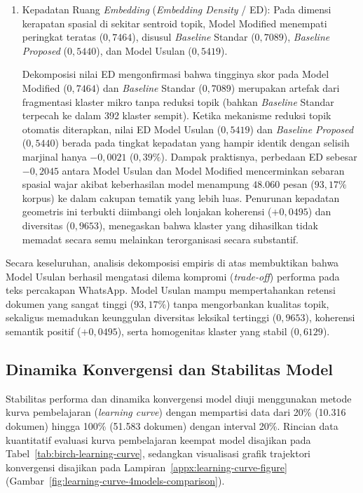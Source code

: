 \begin{enumerate}[label=\alph*., leftmargin=*, itemsep=6pt]
    \item Kepadatan Ruang \textit{Embedding} (\textit{Embedding Density} / ED):
    Pada dimensi kerapatan spasial di sekitar sentroid topik, Model Modified menempati peringkat teratas ($0{,}7464$), disusul \textit{Baseline} Standar ($0{,}7089$), \textit{Baseline Proposed} ($0{,}5440$), dan Model Usulan ($0{,}5419$).
    
    Dekomposisi nilai ED mengonfirmasi bahwa tingginya skor pada Model Modified ($0{,}7464$) dan \textit{Baseline} Standar ($0{,}7089$) merupakan artefak dari fragmentasi klaster mikro tanpa reduksi topik (bahkan \textit{Baseline} Standar terpecah ke dalam 392 klaster sempit). Ketika mekanisme reduksi topik otomatis diterapkan, nilai ED Model Usulan ($0{,}5419$) dan \textit{Baseline Proposed} ($0{,}5440$) berada pada tingkat kepadatan yang hampir identik dengan selisih marjinal hanya $-0{,}0021$ ($0{,}39\%$). Dampak praktisnya, perbedaan ED sebesar $-0{,}2045$ antara Model Usulan dan Model Modified mencerminkan sebaran spasial wajar akibat keberhasilan model menampung $48.060$ pesan ($93{,}17\%$ korpus) ke dalam cakupan tematik yang lebih luas. Penurunan kepadatan geometris ini terbukti diimbangi oleh lonjakan koherensi ($+0{,}0495$) dan diversitas ($0{,}9653$), menegaskan bahwa klaster yang dihasilkan tidak memadat secara semu melainkan terorganisasi secara substantif.
\end{enumerate}

Secara keseluruhan, analisis dekomposisi empiris di atas membuktikan bahwa Model Usulan berhasil mengatasi dilema kompromi (\textit{trade-off}) performa pada teks percakapan WhatsApp. Model Usulan mampu mempertahankan retensi dokumen yang sangat tinggi ($93{,}17\%$) tanpa mengorbankan kualitas topik, sekaligus memadukan keunggulan diversitas leksikal tertinggi ($0{,}9653$), koherensi semantik positif ($+0{,}0495$), serta homogenitas klaster yang stabil ($0{,}6129$).

\subsection{Dinamika Konvergensi dan Stabilitas Model}
\label{subsec:evaluasi-learning-curve}

Stabilitas performa dan dinamika konvergensi model diuji menggunakan metode kurva pembelajaran (\textit{learning curve}) dengan mempartisi data dari 20\% (10.316 dokumen) hingga 100\% (51.583 dokumen) dengan interval 20\%. Rincian data kuantitatif evaluasi kurva pembelajaran keempat model disajikan pada Tabel~\ref{tab:birch-learning-curve}, sedangkan visualisasi grafik trajektori konvergensi disajikan pada Lampiran~\ref{appx:learning-curve-figure} (Gambar~\ref{fig:learning-curve-4models-comparison}).

